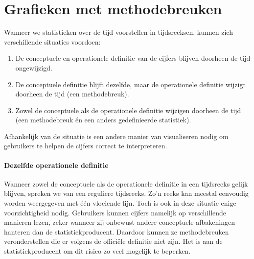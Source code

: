 \documentclass{VSAnote}
\begin{document}
%
%
%
%
%
%
%














\section{Grafieken met methodebreuken}

Wanneer we statistieken over de tijd voorstellen in tijdsreeksen, kunnen zich verschillende situaties voordoen:
\begin{enumerate}
\item De conceptuele en operationele definitie van de cijfers blijven doorheen de tijd ongewijzigd.
\item De conceptuele definitie blijft dezelfde, maar de operationele definitie wijzigt doorheen de tijd (een methodebreuk).
\item Zowel de conceptuele als de operationele definitie wijzigen doorheen de tijd (een methodebreuk én een anders gedefinieerde statistiek).
\end{enumerate}
Afhankelijk van de situatie is een andere manier van visualiseren nodig om gebruikers te helpen de cijfers correct te interpreteren.


\paragraph{Dezelfde operationele definitie}

Wanneer zowel de conceptuele als de operationele definitie in een tijdsreeks gelijk blijven, spreken we van een reguliere tijdsreeks. Zo’n reeks kan meestal eenvoudig worden weergegeven met één vloeiende lijn. Toch is ook in deze situatie enige voorzichtigheid nodig. Gebruikers kunnen cijfers namelijk op verschillende manieren lezen, zeker wanneer zij onbewust andere conceptuele afbakeningen hanteren dan de statistiekproducent. Daardoor kunnen ze methodebreuken veronderstellen die er volgens de officiële definitie niet zijn. Het is aan de statistiekproducent om dit risico zo veel mogelijk te beperken.
\end{document}
